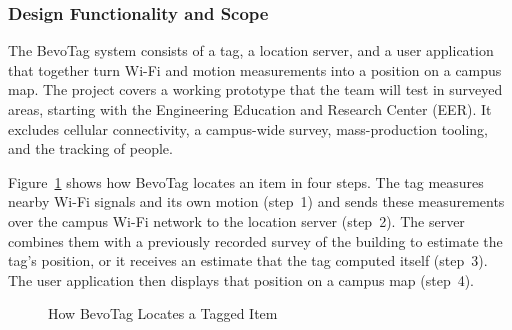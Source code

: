 \documentclass[12pt,letterpaper]{article}
\begin{document}
\subsubsection{Design Functionality and Scope}
The BevoTag system consists of a tag, a location server, and a user application that together turn
Wi-Fi and motion measurements into a position on a campus map. The project covers a working
prototype that the team will test in surveyed areas, starting with the Engineering Education and
Research Center (EER). It excludes cellular connectivity, a campus-wide survey, mass-production
tooling, and the tracking of people.

Figure~\ref{fig:overview} shows how BevoTag locates an item in four steps. The tag measures nearby
Wi-Fi signals and its own motion (step~1) and sends these measurements over the campus Wi-Fi
network to the location server (step~2). The server combines them with a previously recorded survey
of the building to estimate the tag's position, or it receives an estimate that the tag computed
itself (step~3). The user application then displays that position on a campus map (step~4).

\begin{figure}[!htb]
\centering
{}
\caption{How BevoTag Locates a Tagged Item}
\label{fig:overview}
\end{figure}
\end{document}
